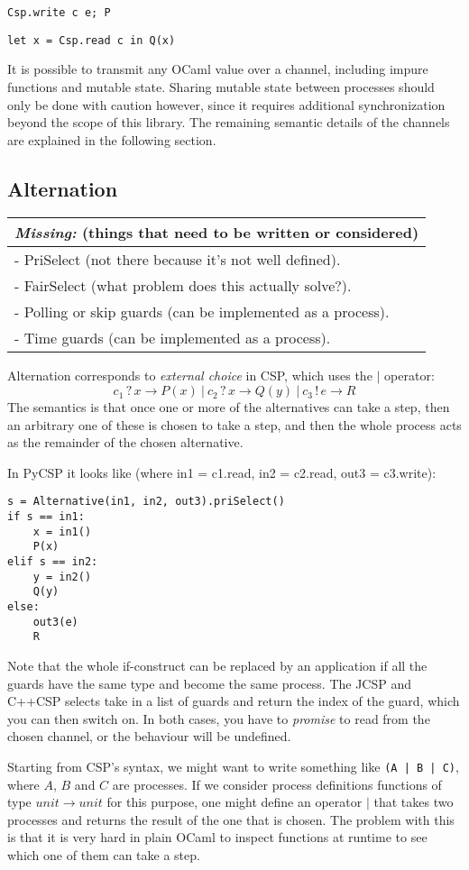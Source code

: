 \documentclass[a4paper,12pt]{article}
\newcommand{\missing}[1]{
  \begin{tabular}{|p{11cm}|}
    \hline
    \emph{Missing:} {\scriptsize (things that need to be written or considered)} \\
    \hline
    #1
    \hline
  \end{tabular}
}
\begin{document}
\begin{verbatim}
Csp.write c e; P
\end{verbatim}
\begin{verbatim}
let x = Csp.read c in Q(x)
\end{verbatim}

It is possible to transmit any OCaml value over a channel, including impure functions and mutable 
state. Sharing mutable state between processes should only be done with caution however, since it 
requires additional synchronization beyond the scope of this library. The remaining semantic 
details of the channels are explained in the following section.

\subsection{Alternation}
\missing{
- PriSelect (not there because it's not well defined).\\
- FairSelect (what problem does this actually solve?).\\
- Polling or skip guards (can be implemented as a process). \\
- Time guards (can be implemented as a process). \\
}

Alternation corresponds to \emph{external choice} in CSP, which uses the $|$ operator:
\[c_1\,?\,x \to P(x)\ |\ c_2\,?\,x \to Q(y)\ |\ c_3\,!\,e \to R\]
The semantics is that once one or more of the alternatives can take a step, then
an arbitrary one of these is chosen to take a step, and then the whole process acts as 
the remainder of the chosen alternative.

In PyCSP it looks like (where in1 = c1.read, in2 = c2.read, out3 = c3.write):
\begin{verbatim}
s = Alternative(in1, in2, out3).priSelect()
if s == in1:
    x = in1()
    P(x)
elif s == in2:
    y = in2()
    Q(y)
else:
    out3(e)
    R
\end{verbatim}

Note that the whole if-construct can be replaced by an application if all the guards have the same type 
and become the same process. The JCSP and C++CSP selects take in a list of guards and return the index
of the guard, which you can then switch on. In both cases, you have to \emph{promise} to read from the
chosen channel, or the behaviour will be undefined.

Starting from CSP's syntax, we might want to write something like \texttt{(A | B | C)}, where $A$, $B$
and $C$ are processes. If we consider process definitions functions of type $unit \to unit$ for this 
purpose, one might define an operator $|$ that takes two processes and returns the result of the one that 
is chosen. The problem with this is that it is very hard in plain OCaml to inspect functions at runtime 
to see which one of them can take a step.
\end{document}
